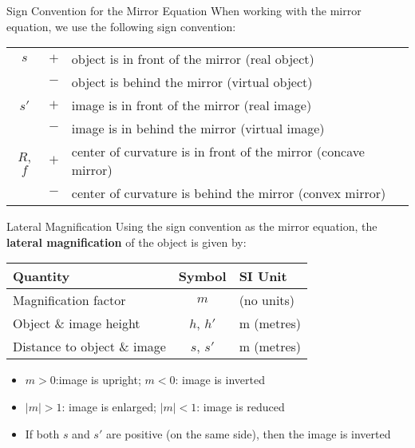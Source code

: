 \documentclass[12pt,compress,aspectratio=169]{beamer}
\newcommand{\eq}[2]{\vspace{#1}{\LARGE\begin{displaymath}#2\end{displaymath}}}
\begin{document}
\begin{frame}{Sign Convention for the Mirror Equation}
  When working with the mirror equation, we use the following sign convention:
  
  \eq{-.2in}{
    \boxed{\frac1s+\frac1{s'}=\frac1f}
  }
  \begin{center}
    \begin{tabular}{ccl}
      \hline
      $s$ & $+$ & object is in front of the mirror (real object) \\
      & $-$ & object is behind the mirror (virtual object)\\\hline
      $s'$ & $+$ & image is in front of the mirror (real image)\\
      & $-$ & image is in behind the mirror (virtual image)\\\hline
      $R$, $f$ & $+$ & center of curvature is in front of the mirror
      (concave mirror)\\
      & $-$ & center of curvature is behind the mirror (convex mirror)\\
      \hline
    \end{tabular}
  \end{center}
\end{frame}



\begin{frame}{Lateral Magnification}
  Using the sign convention as the mirror equation, the
  \textbf{lateral magnification} of the object is given by:

  \eq{-.2in}{
    \boxed{m=\frac{h'}h=-\frac{s'}s}
  }
  \begin{center}
    \begin{tabular}{l|c|l}
      \rowcolor{pink}
      \textbf{Quantity} & \textbf{Symbol} & \textbf{SI Unit} \\ \hline
      Magnification factor & $m$ & (no units)\\
      Object \& image height & $h$, $h'$  & \si{\metre} (metres)\\
      Distance to object \& image & $s$, $s'$  & \si{\metre} (metres)
    \end{tabular}
  \end{center}
  \begin{itemize}
  \item $m>0$:image is upright; $m<0$: image is inverted
  \item $|m|>1$: image is enlarged; $|m|<1$: image is reduced
  \item If both $s$ and $s'$ are positive (on the same side), then the image
    is inverted
  \end{itemize}
\end{frame}
\end{document}

